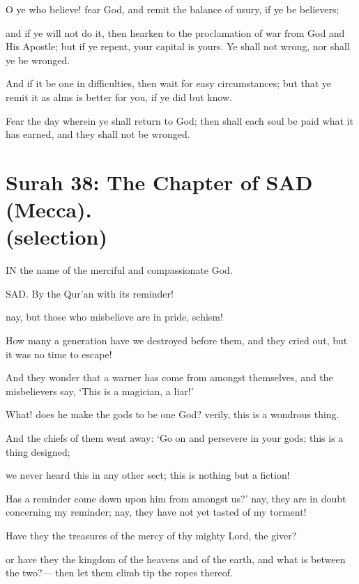 \documentclass[fontsize=14pt, letterpaper, notitlepage, openany, DIV=12]{scrbook} %
\begin{document}
\noindent[2:278]
O ye who believe! fear God, and remit the balance of usury, if ye be believers;

\noindent[2:279]
and if ye will not do it, then hearken to the proclamation of war from God and His
Apostle; but if ye repent, your capital is yours. Ye shall not wrong, nor shall ye be wronged.

\noindent[2:280]
And if it be one in difficulties, then wait for easy circumstances; but that ye remit it as
alms is better for you, if ye did but know.

\noindent[2:281]
Fear the day wherein ye shall return to God; then shall each soul be paid what it has
earned, and they shall not be wronged.


\section[Surah 38: The Chapter of SAD (Mecca).]{Surah 38: The Chapter of SAD (Mecca).\\ (selection)}


IN the name of the merciful and compassionate God.

\noindent[38:1]
SAD. By the Qur'an with its reminder!

\noindent[38:2]
nay, but those who misbelieve are in pride, schism!

\noindent[38:3]
How many a generation have we destroyed before them, and they cried out, but it was no
time to escape!

\noindent[38:4]
And they wonder that a warner has come from amongst themselves, and the misbelievers
say, `This is a magician, a liar!'

\noindent[38:5]
What! does he make the gods to be one God? verily, this is a wondrous thing.

\noindent[38:6]
And the chiefs of them went away: `Go on and persevere in your gods; this is a thing
designed;

\noindent[38:7]
we never heard this in any other sect; this is nothing but a fiction!

\noindent[38:8]
Has a reminder come down upon him from amongst us?' nay, they are in doubt
concerning my reminder; nay, they have not yet tasted of my torment!

\noindent[38:9]
Have they the treasures of the mercy of thy mighty Lord, the giver?

\noindent[38:10]
or have they the kingdom of the heavens and of the earth, and what is between the
two?--- then let them climb tip the ropes thereof.
\end{document}
